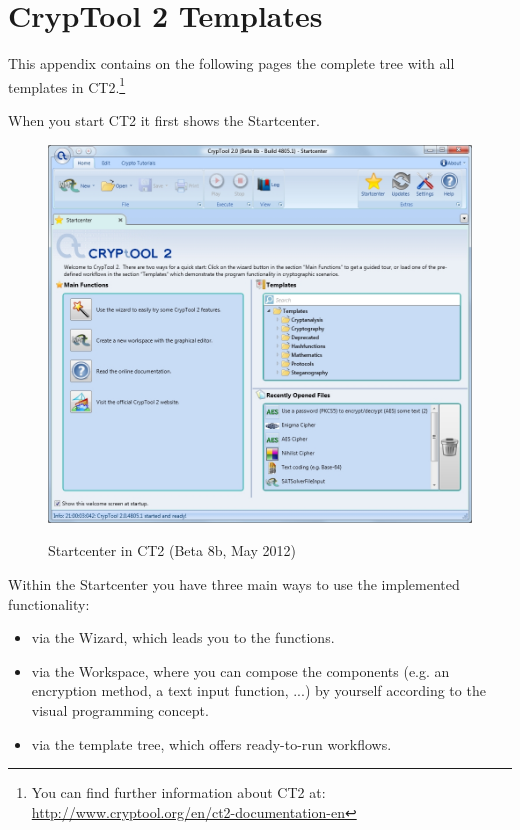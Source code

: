 \newpage
\hypertarget{appendix-template-overview-CT2}{}
\section{CrypTool 2 Templates}
\label{s:appendix-template-overview-CT2}

\noindent This appendix contains on the following pages the complete tree with
all templates in CT2.\footnote{%
  You can find further information about CT2 at:
  \url{http://www.cryptool.org/en/ct2-documentation-en}
}

\noindent When you start CT2 it first shows the Startcenter.

\begin{figure}[hb]
\begin{center}
\includegraphics[scale=0.45, angle=0] {figures/CT2-Startcenter-en}
\hypertarget{Welcome-CT2}{}
\caption{Startcenter in CT2 (Beta 8b, May 2012)} 
\label{Welcome-Screenshot-CT2}
\end{center}
\end{figure}

\noindent Within the Startcenter you have three main ways to use the implemented functionality:
\begin{itemize}
   \item via the Wizard, which leads you to the functions.
   \item via the Workspace, where you can compose the components (e.g. an encryption method, a text input function, ...)  by yourself according to the visual programming concept.
   \item via the template tree, which offers ready-to-run workflows.
 \end{itemize}

